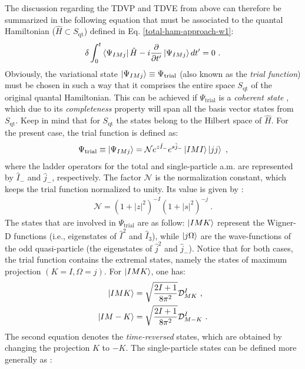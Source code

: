 The discussion regarding the TDVP and TDVE from above can therefore be summarized in the following equation that must be associated to the quantal Hamiltonian ($\hat{H}\subset S_\text{qt}$) defined in Eq. \ref{total-ham-approach-w1}:
\begin{align}
    \delta\int_0^t\bra{\Psi_{IMj}}\hat{H}-i\frac{\partial}{\partial t'}\ket{\Psi_{IMj}}dt'=0\ .
    \label{tdve-approach-w1}
\end{align}
Obviously, the variational state $\ket{\Psi_{IMj}}\equiv\Psi_\text{trial}$ (also known as the \emph{trial function}) must be chosen in such a way that it comprises the entire space $S_\text{qt}$ of the original quantal Hamiltonian. This can be achieved if $\Psi_\text{trial}$ is a \emph{coherent state} \cite{glauber1963coherent}, which due to its \emph{completeness} property will span all the basis vector states from $S_\text{qt}$. Keep in mind that for $S_\text{qt}$ the states belong to the Hilbert space of $\hat{H}$. For the present case, the trial function is defined as:
\begin{align}
    \Psi_\text{trial}\equiv\ket{\Psi_{IMj}}=\mathcal{N}e^{z\hat{I}_-}e^{s\hat{j}_-}\ket{IMI}\ket{jj}\ ,
    \label{trial-function-appeoach-w1}
\end{align}
where the ladder operators for the total and single-particle a.m. are represented by $\hat{I}_-$ and $\hat{j}_-$, respectively. The factor $\mathcal{N}$ is the normalization constant, which keeps the trial function normalized to unity. Its value is given by \cite{raduta2007semiclassical,raduta2020new}:
\begin{align}
    \mathcal{N}=\left(1+|z|^2\right)^{-I}\left(1+|s|^2\right)^{-j}\ .
\end{align}
The states that are involved in $\Psi_\text{trial}$ are as follow: $\ket{IMK}$ represent the Wigner-D functions (i.e., eigenstates of $\hat{I}^2$ and $\hat{I}_3$), while $\ket{j\Omega}$ are the wave-functions of the odd quasi-particle (the eigenstates of $\hat{j}^2$ and $\hat{j}_-$). Notice that for both cases, the trial function contains the extremal states, namely the states of maximum projection $(K=I,\Omega=j)$. For $\ket{IMK}$, one has:
\begin{align}
    \ket{IMK}&=\sqrt{\frac{2I+1}{8\pi^2}}\mathcal{D}_{MK}^I\ , \nonumber\\
    \ket{IM-K}&=\sqrt{\frac{2I+1}{8\pi^2}}\mathcal{D}_{M-K}^I\ .
    \label{IMK-wigner-functions}
\end{align}
The second equation denotes the \emph{time-reversed} states, which are obtained by changing the projection $K$ to $-K$. The single-particle states can be defined more generally as \cite{hecht1962asymmetric}:
